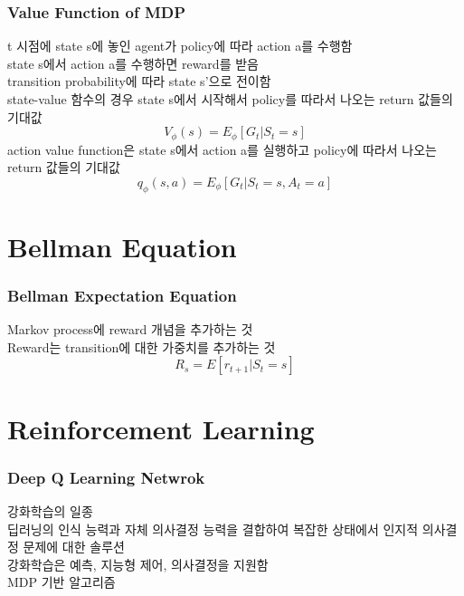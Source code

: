 \documentclass{beamer}
\begin{document}
\begin{frame}
	\frametitle{Value Function of MDP}
		\begin{figure}
		\end{figure}		
		t 시점에 state s에 놓인 agent가 policy에 따라 action a를 수행함\\
		state s에서 action a를 수행하면 reward를 받음\\
		transition probability에 따라 state s'으로 전이함\\
		state-value 함수의 경우 state s에서 시작해서 policy를 따라서 나오는 return 값들의 기대값\\
		\begin{equation}\label{state value function}
			V_{\phi}(s) = E_{\phi}[G_{t} | S_{t} = s]
		\end{equation}
		action value function은 state s에서 action a를 실행하고 policy에 따라서 나오는 return 값들의 기대값\\
		\begin{equation}\label{action value function}
			q_{\phi}(s, a) = E_{\phi}[G_{t} | S_{t} = s, A_{t} = a]
		\end{equation}
\end{frame}

\section{Bellman Equation}
\begin{frame}
	\frametitle{Bellman Expectation Equation}
		Markov process에 reward 개념을 추가하는 것\\
		Reward는 transition에 대한 가중치를 추가하는 것\\
		\begin{equation}\label{immediate reward}
			R_s = E[r_{t+1} | S_t = s]
		\end{equation}
\end{frame}

\section{Reinforcement Learning}
\begin{frame}
	\frametitle{Deep Q Learning Netwrok}
		강화학습의 일종\\
		딥러닝의 인식 능력과 자체 의사결정 능력을 결합하여 복잡한 상태에서 인지적 의사결정 문제에 대한 솔루션\\
		강화학습은 예측, 지능형 제어, 의사결정을 지원함\\
		MDP 기반 알고리즘\\
\end{frame}
\end{document}
